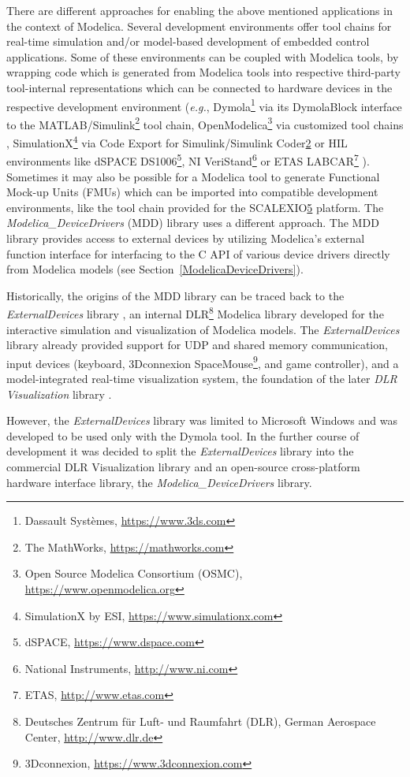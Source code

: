\documentclass{resources/modelica}
\begin{document}
There are different approaches for enabling the above mentioned applications in
the context of Modelica. Several development environments offer tool chains for
real-time simulation and/or model-based development of embedded control
applications.
Some of these environments can be coupled with Modelica tools, by wrapping code
which is generated from Modelica tools into respective third-party tool-internal
representations which can be connected to hardware devices in the respective
development environment (\textit{e.g.}, Dymola\footnote{Dassault Systèmes,
\url{https://www.3ds.com}} via its DymolaBlock interface to the
MATLAB/Simulink\footnote{\label{tmw}The MathWorks, \url{https://mathworks.com}}
tool chain, OpenModelica\footnote{Open Source Modelica Consortium (OSMC),
\url{https://www.openmodelica.org}} via customized tool chains
\citep{Worschech2012}, SimulationX\footnote{SimulationX by ESI,
\url{https://www.simulationx.com}} via Code Export for Simulink/Simulink
Coder\cref{tmw} or HIL environments like dSPACE
DS1006\footnote{\label{dspace}dSPACE, \url{https://www.dspace.com}}, NI
VeriStand\footnote{National Instruments, \url{http://www.ni.com}} or ETAS
LABCAR\footnote{ETAS, \url{http://www.etas.com}} \citep{Blochwitz2009}).
Sometimes it may also be possible for a Modelica tool to generate Functional
Mock-up Units (FMUs) which can be imported into compatible development
environments, like the tool chain provided for the SCALEXIO\cref{dspace}
platform.
The \emph{Modelica\_DeviceDrivers} (MDD) library uses a different approach.
The MDD library provides access to external devices by utilizing Modelica's external
function interface for interfacing to the C API of various device drivers directly from Modelica
models (see Section~\ref{ModelicaDeviceDrivers}).

Historically, the origins of the MDD library can be traced back to the
\emph{ExternalDevices} library \citep{Bellmann2009}, an internal
DLR\footnote{Deutsches Zentrum für Luft- und Raumfahrt (DLR), German Aerospace
Center, \url{http://www.dlr.de}} Modelica library developed for the interactive
simulation and visualization of Modelica models. The \emph{ExternalDevices} library already provided support for UDP and shared memory communication, input devices (keyboard, 3Dconnexion
SpaceMouse\footnote{3Dconnexion, \url{https://www.3dconnexion.com}}, and game controller), and a model-integrated real-time visualization
system, the foundation of the later \emph{DLR Visualization} library
\citep{Hellerer2014}.

However, the \emph{ExternalDevices} library was limited to
Microsoft Windows and was developed to be used only with
the Dymola tool. In the further course of development it was decided to
split the \emph{ExternalDevices} library into the commercial DLR
Visualization library and an open-source cross-platform hardware interface
library, the \emph{Modelica\_DeviceDrivers} library.
\end{document}
